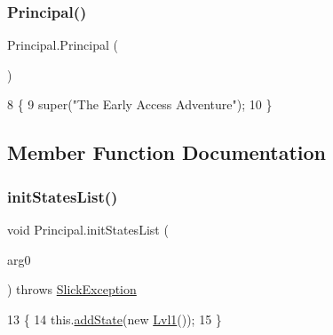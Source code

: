 \subsubsection{\texorpdfstring{Principal()}{Principal()}}
{\footnotesize\ttfamily Principal.\+Principal (\begin{DoxyParamCaption}{ }\end{DoxyParamCaption})\hspace{0.3cm}{\ttfamily [inline]}}


\begin{DoxyCode}
8                       \{
9         super(\textcolor{stringliteral}{"The Early Access Adventure"});
10     \}
\end{DoxyCode}


\subsection{Member Function Documentation}
\mbox{\label{class_principal_ab5582a52acd5ef67a52625e0a44ac2e9}} 
\subsubsection{\texorpdfstring{init\+States\+List()}{initStatesList()}}
{\footnotesize\ttfamily void Principal.\+init\+States\+List (\begin{DoxyParamCaption}\item[{\mbox{\hyperlink{classorg_1_1newdawn_1_1slick_1_1_game_container}{Game\+Container}}}]{arg0 }\end{DoxyParamCaption}) throws \mbox{\hyperlink{classorg_1_1newdawn_1_1slick_1_1_slick_exception}{Slick\+Exception}}\hspace{0.3cm}{\ttfamily [inline]}}


\begin{DoxyCode}
13                                                                         \{
14         this.\mbox{\hyperlink{classorg_1_1newdawn_1_1slick_1_1state_1_1_state_based_game_acfd4acadb4a4f79fddd7e76250da37dc}{addState}}(\textcolor{keyword}{new} \mbox{\hyperlink{class_lvl1}{Lvl1}}());
15     \}
\end{DoxyCode}
\mbox{\label{class_principal_a122f5159f9c20dc1ac51d94a71dde7a5}} 

